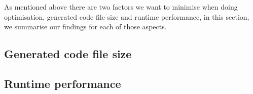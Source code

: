 As mentioned above there are two factors we want to minimise when doing
optimisation, generated code file size and runtime performance, in this
section, we summarise our findings for each of those aspects.

\subsection{Generated code file size}
\subsection{Runtime performance}
